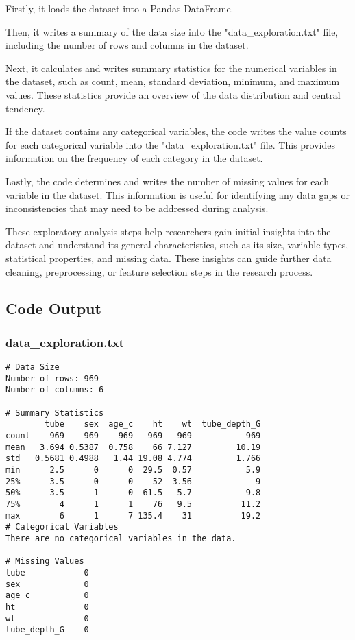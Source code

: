 \documentclass[11pt]{article}
\begin{document}
Firstly, it loads the dataset into a Pandas DataFrame. 

Then, it writes a summary of the data size into the "data\_exploration.txt" file, including the number of rows and columns in the dataset.

Next, it calculates and writes summary statistics for the numerical variables in the dataset, such as count, mean, standard deviation, minimum, and maximum values. These statistics provide an overview of the data distribution and central tendency.

If the dataset contains any categorical variables, the code writes the value counts for each categorical variable into the "data\_exploration.txt" file. This provides information on the frequency of each category in the dataset.

Lastly, the code determines and writes the number of missing values for each variable in the dataset. This information is useful for identifying any data gaps or inconsistencies that may need to be addressed during analysis.

These exploratory analysis steps help researchers gain initial insights into the dataset and understand its general characteristics, such as its size, variable types, statistical properties, and missing data. These insights can guide further data cleaning, preprocessing, or feature selection steps in the research process.

\subsection{Code Output}

\subsubsection*{data\_exploration.txt}

\begin{Verbatim}[tabsize=4]
# Data Size
Number of rows: 969
Number of columns: 6

# Summary Statistics
        tube    sex  age_c    ht    wt  tube_depth_G
count    969    969    969   969   969           969
mean   3.694 0.5387  0.758    66 7.127         10.19
std   0.5681 0.4988   1.44 19.08 4.774         1.766
min      2.5      0      0  29.5  0.57           5.9
25%      3.5      0      0    52  3.56             9
50%      3.5      1      0  61.5   5.7           9.8
75%        4      1      1    76   9.5          11.2
max        6      1      7 135.4    31          19.2
# Categorical Variables
There are no categorical variables in the data.

# Missing Values
tube            0
sex             0
age_c           0
ht              0
wt              0
tube_depth_G    0

\end{Verbatim}
\end{document}
